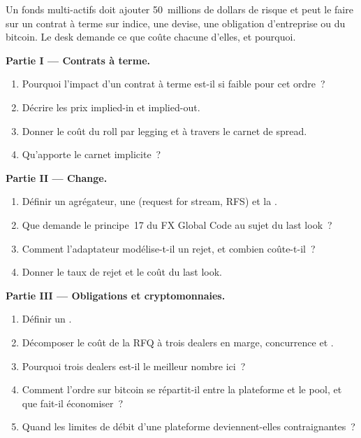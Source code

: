 \begin{problem}\label{pb:mx:execution-beyond-equities:1}
Un fonds multi-actifs doit ajouter 50~millions de dollars de risque et peut le faire sur un contrat à terme sur indice, une devise, une obligation d'entreprise ou du bitcoin. Le desk demande ce que
coûte chacune d'elles, et pourquoi.

\medskip\noindent\textbf{Partie I --- Contrats à terme.}
\begin{enumerate}
\item Pourquoi l'impact d'un contrat à terme est-il si faible pour cet ordre~?
\item Décrire les prix implied-in et implied-out.
\item Donner le coût du roll par legging et à travers le carnet de spread.
\item Qu'apporte le carnet implicite~?
\end{enumerate}

\medskip\noindent\textbf{Partie II --- Change.}
\begin{enumerate}[resume]
\item Définir un agrégateur, une  (request for stream, RFS) et la .
\item Que demande le principe~17 du FX Global Code au sujet du last look~?
\item Comment l'adaptateur modélise-t-il un rejet, et combien coûte-t-il~?
\item Donner le taux de rejet et le coût du last look.
\end{enumerate}

\medskip\noindent\textbf{Partie III --- Obligations et cryptomonnaies.}
\begin{enumerate}[resume]
\item Définir un .
\item Décomposer le coût de la RFQ à trois dealers en marge, concurrence et .
\item Pourquoi trois dealers est-il le meilleur nombre ici~?
\item Comment l'ordre sur bitcoin se répartit-il entre la plateforme et le pool, et que fait-il économiser~?
\item Quand les limites de débit d'une plateforme deviennent-elles contraignantes~?
\end{enumerate}


\end{problem}
